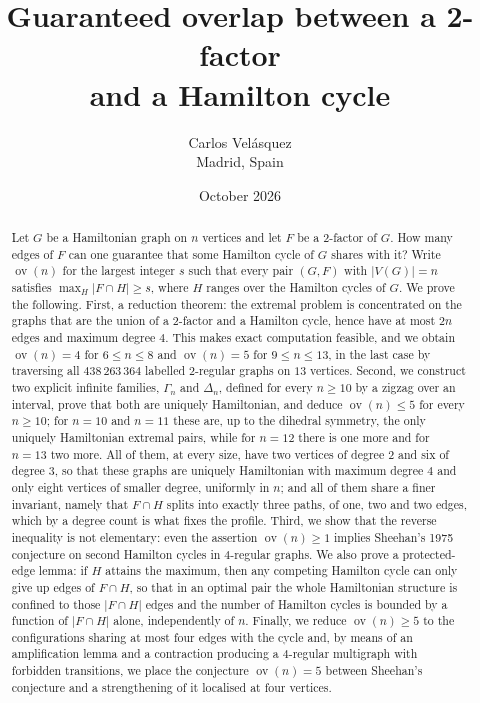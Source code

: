 \documentclass[11pt,a4paper]{article}
\title{Guaranteed overlap between a 2-factor\\ and a Hamilton cycle}
\author{Carlos Velásquez\\ \small Madrid, Spain}
\date{October 2026}
\theoremstyle{definition}
\theoremstyle{remark}
\newcommand{\ov}{\operatorname{ov}}
\begin{document}
\maketitle

\begin{abstract}
Let $G$ be a Hamiltonian graph on $n$ vertices and let $F$ be a 2-factor of $G$. How many edges of $F$ can one guarantee that some Hamilton cycle of $G$ shares with it? Write $\ov(n)$ for the largest integer $s$ such that every pair $(G,F)$ with $|V(G)|=n$ satisfies $\max_H|F\cap H|\ge s$, where $H$ ranges over the Hamilton cycles of $G$. We prove the following. First, a reduction theorem: the extremal problem is concentrated on the graphs that are the union of a 2-factor and a Hamilton cycle, hence have at most $2n$ edges and maximum degree $4$. This makes exact computation feasible, and we obtain $\ov(n)=4$ for $6\le n\le8$ and $\ov(n)=5$ for $9\le n\le13$, in the last case by traversing all $438\,263\,364$ labelled $2$-regular graphs on $13$ vertices. Second, we construct two explicit infinite families, $\Gamma_n$ and $\Delta_n$, defined for every $n\ge10$ by a zigzag over an interval, prove that both are uniquely Hamiltonian, and deduce $\ov(n)\le5$ for every $n\ge10$; for $n=10$ and $n=11$ these are, up to the dihedral symmetry, the only uniquely Hamiltonian extremal pairs, while for $n=12$ there is one more and for $n=13$ two more. All of them, at every size, have two vertices of degree $2$ and six of degree $3$, so that these graphs are uniquely Hamiltonian with maximum degree $4$ and only eight vertices of smaller degree, uniformly in $n$; and all of them share a finer invariant, namely that $F\cap H$ splits into exactly three paths, of one, two and two edges, which by a degree count is what fixes the profile. Third, we show that the reverse inequality is not elementary: even the assertion $\ov(n)\ge1$ implies Sheehan's 1975 conjecture on second Hamilton cycles in $4$-regular graphs. We also prove a protected-edge lemma: if $H$ attains the maximum, then any competing Hamilton cycle can only give up edges of $F\cap H$, so that in an optimal pair the whole Hamiltonian structure is confined to those $|F\cap H|$ edges and the number of Hamilton cycles is bounded by a function of $|F\cap H|$ alone, independently of $n$. Finally, we reduce $\ov(n)\ge5$ to the configurations sharing at most four edges with the cycle and, by means of an amplification lemma and a contraction producing a $4$-regular multigraph with forbidden transitions, we place the conjecture $\ov(n)=5$ between Sheehan's conjecture and a strengthening of it localised at four vertices.
\end{abstract}
\end{document}
